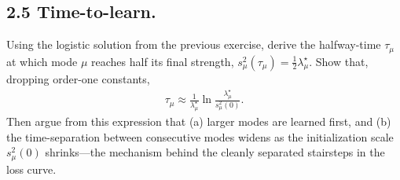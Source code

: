 \subsection*{2.5 Time-to-learn.}
Using the logistic solution from the previous exercise, derive the halfway-time
$\tau_\mu$ at which mode $\mu$ reaches half its final strength,
$s^2_\mu(\tau_\mu) = \tfrac{1}{2}\lambda^\star_\mu$. Show that, dropping order-one
constants,
\begin{align*}
    \tau_\mu \approx \frac{1}{\lambda^\star_\mu} \ln \frac{\lambda^\star_\mu}{s^2_\mu(0)}.
\end{align*}
Then argue from this expression that (a) larger modes are learned first, and (b)
the time-separation between consecutive modes widens as the initialization scale
$s^2_\mu(0)$ shrinks---the mechanism behind the cleanly separated stairsteps in
the loss curve.
